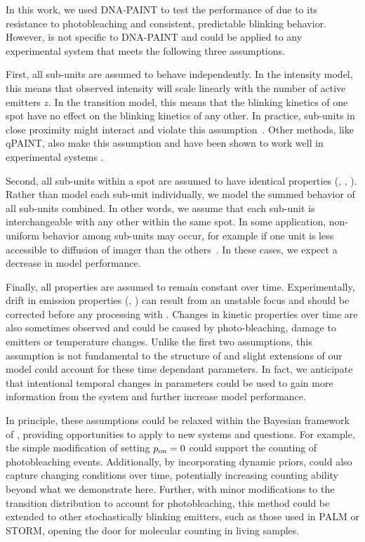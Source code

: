 In this work, we used DNA-PAINT to test the performance of \ours 
due to its resistance to photobleaching and consistent, 
predictable blinking behavior.
  However, \ours is not specific to DNA-PAINT and could be 
  applied to any experimental system that meets the following three assumptions.

  First, all sub-units are assumed to behave independently.
  In the intensity model, this means that observed intensity will scale
  linearly with the number of active emitters $z$.
  In the transition model, this means that the blinking kinetics of one spot
  have no effect on the blinking kinetics of any other.
  In practice, sub-units in close proximity might 
  interact and violate this assumption~\citep{helmerich_photoswitching_2022}. 
  Other methods, like qPAINT, also make this assumption and have been shown to
  work well in experimental systems \citep{fischer_quantitative_2021,
  jayasinghe_true_2018}. 

  Second, all sub-units within a spot are assumed to have identical properties
  (\pon, \poff, \re).
  Rather than model each sub-unit individually, we model the summed behavior
  of all sub-units combined. 
  In other words, we assume that each sub-unit is
  interchangeable with any other within the same spot.
  In some application, non-uniform behavior among sub-units may occur, for example
  if one unit is less accessible to diffusion of
  imager than the others~\citep{civitci_2020}. 
  In these cases, we expect a decrease in model performance.

Finally, all properties are assumed to remain constant over time. 
  Experimentally, drift in emission properties (\re, \rb) can result from 
  an unstable focus and should be corrected before any processing with
  \ours.
  Changes in kinetic properties over time are also sometimes observed and could
  be caused by photo-bleaching, damage to emitters or temperature changes. 
  Unlike the first two assumptions, this assumption is not fundamental to the
  structure of \ours and slight extensions of our model could account for these
  time dependant parameters.
  In fact, we anticipate that intentional temporal changes in parameters could be used to gain more
  information from the system and further increase model performance.

In principle, these assumptions could be relaxed within the Bayesian framework of \ours,
providing opportunities to apply \ours to new systems and questions.
    For example, the simple modification of setting $p_\text{on}=0$ could support the
    counting of photobleaching events.
    Additionally, by incorporating dynamic priors, \ours could also capture
    changing conditions over time, potentially increasing counting
    ability beyond what we demonstrate here.
    Further, with minor modifications to the transition distribution to account
    for photobleaching, this method could be extended to other stochastically
    blinking emitters, such as those used in PALM or STORM, opening the door
    for molecular counting in living samples.
